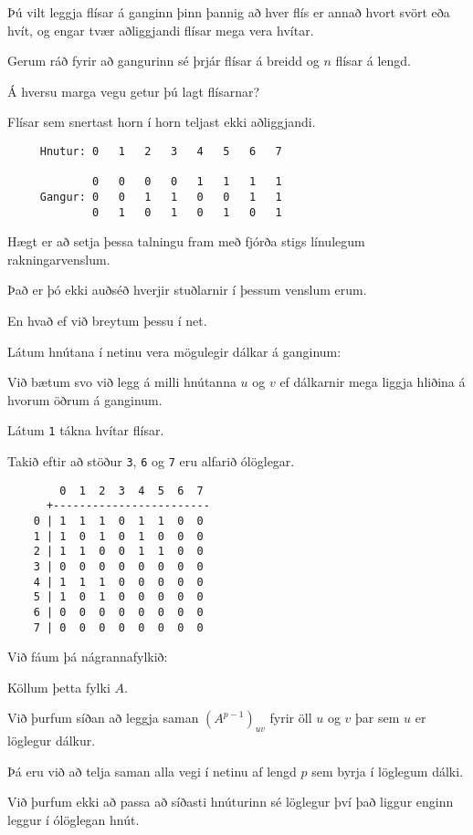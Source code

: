 {
	{
		\item<1-> Þú vilt leggja flísar á ganginn þinn þannig að hver flís er annað hvort svört eða hvít,
					og engar tvær aðliggjandi flísar mega vera hvítar.
		\item<2-> Gerum ráð fyrir að gangurinn sé þrjár flísar á breidd og $n$ flísar á lengd.
		\item<3-> Á hversu marga vegu getur þú lagt flísarnar?
		\item<4-> Flísar sem snertast horn í horn teljast ekki aðliggjandi.
	}
}

{ \begin{verbatim}
     Hnutur: 0   1   2   3   4   5   6   7

             0   0   0   0   1   1   1   1
     Gangur: 0   0   1   1   0   0   1   1
             0   1   0   1   0   1   0   1
\end{verbatim}}
{
	{
		\item<1-> Hægt er að setja þessa talningu fram með fjórða stigs línulegum rakningarvenslum.
		\item<2-> Það er þó ekki auðséð hverjir stuðlarnir í þessum venslum erum.
		\item<3-> En hvað ef við breytum þessu í net.
		\item<4-> Látum hnútana í netinu vera mögulegir dálkar á ganginum:
		\item<5->[] \gangar
		\item<6-> Við bætum svo við legg á milli hnútanna $u$ og $v$ ef dálkarnir mega liggja hliðina á hvorum öðrum á ganginum.
		\item<7-> Látum \texttt{1} tákna hvítar flísar.
		\item<8-> Takið eftir að stöður \texttt{3}, \texttt{6} og \texttt{7} eru alfarið ólöglegar.
	}
}

{ \begin{verbatim}
        0  1  2  3  4  5  6  7
      +------------------------
    0 | 1  1  1  0  1  1  0  0
    1 | 1  0  1  0  1  0  0  0
    2 | 1  1  0  0  1  1  0  0
    3 | 0  0  0  0  0  0  0  0
    4 | 1  1  1  0  0  0  0  0
    5 | 1  0  1  0  0  0  0  0
    6 | 0  0  0  0  0  0  0  0
    7 | 0  0  0  0  0  0  0  0
\end{verbatim}}
{
	{
		\item<1-> Við fáum þá nágrannafylkið:
		\item<2->[] \gangarfylki
		\item<3-> Köllum þetta fylki $A$.
		\item<4-> Við þurfum síðan að leggja saman $(A^{p - 1})_{uv}$ fyrir öll $u$ og $v$ þar sem $u$ er löglegur dálkur.
		\item<5-> Þá eru við að telja saman alla vegi í netinu af lengd $p$ sem byrja í löglegum dálki.
		\item<6-> Við þurfum ekki að passa að síðasti hnúturinn sé löglegur því það liggur enginn leggur í ólöglegan hnút.
	}
}

